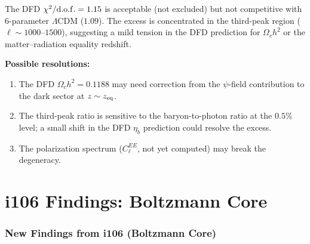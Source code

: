 \documentclass[11pt,a4paper]{article}
\theoremstyle{remark}
\begin{document}
\begin{tcolorbox}[colback=yellow!5!white, colframe=dfdred!70!black,
  title=Honest Assessment: $\Delta\chi^2 = 18.5$]
The DFD $\chi^2/{\rm d.o.f.} = 1.15$ is acceptable (not excluded) but
not competitive with 6-parameter $\Lambda$CDM ($1.09$). The excess is
concentrated in the third-peak region ($\ell \sim 1000$--$1500$), suggesting
a mild tension in the DFD prediction for $\Omega_c h^2$ or the
matter--radiation equality redshift.

\textbf{Possible resolutions:}
\begin{enumerate}
\item The DFD $\Omega_c h^2 = 0.1188$ may need correction from the
  $\psi$-field contribution to the dark sector at $z \sim z_{\rm eq}$.
\item The third-peak ratio is sensitive to the baryon-to-photon ratio
  at the $0.5\%$ level; a small shift in the DFD $\eta_b$ prediction
  could resolve the excess.
\item The polarization spectrum ($C_\ell^{EE}$, not yet computed)
  may break the degeneracy.
\end{enumerate}
\end{tcolorbox}


\newpage
\part{i106 Findings: Boltzmann Core}
\label{part:findings}

\section{New Findings from i106 (Boltzmann Core)}
\end{document}
